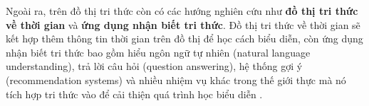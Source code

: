 Ngoài ra, trên đồ thị tri thức còn có các hướng nghiên cứu như \textbf{đồ thị tri thức về thời gian} và \textbf{ứng dụng nhận biết tri thức}. Đồ thị tri thức về thời gian sẽ kết hợp thêm thông tin thời gian trên đồ thị để học cách biểu diễn, còn ứng dụng nhận biết tri thức bao gồm hiểu ngôn ngữ tự nhiên (natural language understanding), trả lời câu hỏi (question answering), hệ thống gợi ý (recommendation systems) và nhiều nhiệm vụ khác trong thế giới thực mà nó tích hợp tri thức vào để cải thiện quá trình học biểu diễn .